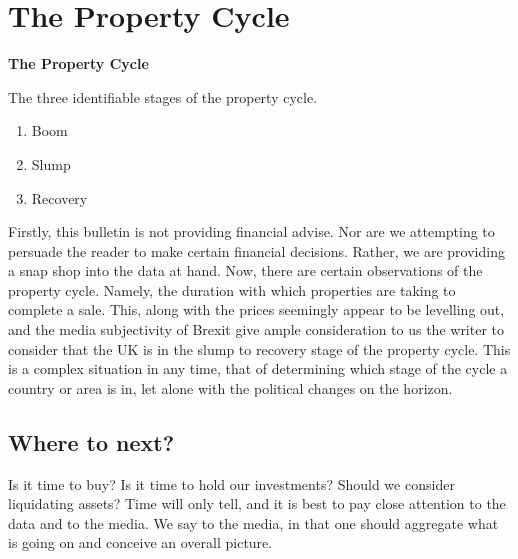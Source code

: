 \documentclass[letterpaper]{scrartcl}
\begin{document}
    \section*{\color{triton_green}The Property Cycle}
            \begin{mdframed}[style=MyFrame]
        \textbf{The Property Cycle} 
        
        The three identifiable stages of the property cycle.
            \begin{enumerate}
                \item Boom
                \item Slump
                \item Recovery
            \end{enumerate}
            Firstly, this bulletin is not providing financial advise. Nor are we attempting to persuade the reader to make certain financial decisions. Rather, we are providing a snap shop into the data at hand. Now, there are certain observations of the property cycle. Namely, the duration with which properties are taking to complete a sale. This, along with the prices seemingly appear to be levelling out, and the media subjectivity of Brexit give ample consideration to us the writer to consider that the UK is in the slump to recovery stage of the property cycle. This is a complex situation in any time, that of determining which stage of the cycle a country or area is in, let alone with the political changes on the horizon. 
        \end{mdframed}
        \subsection*{\color{triton_green}Where to next?}
        Is it time to buy? Is it time to hold our investments? Should we consider liquidating assets? Time will only tell, and it is best to pay close attention to the data and to the media. We say to the media, in that one should aggregate what is going on and conceive an overall picture.
\end{document}
